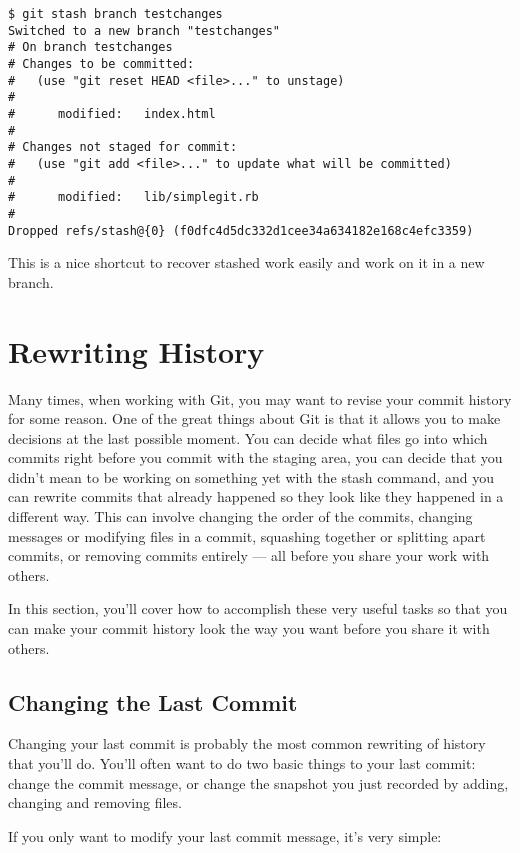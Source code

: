 \documentclass[a4paper]{book}
\begin{document}
\begin{shaded}\begin{verbatim}
$ git stash branch testchanges
Switched to a new branch "testchanges"
# On branch testchanges
# Changes to be committed:
#   (use "git reset HEAD <file>..." to unstage)
#
#      modified:   index.html
#
# Changes not staged for commit:
#   (use "git add <file>..." to update what will be committed)
#
#      modified:   lib/simplegit.rb
#
Dropped refs/stash@{0} (f0dfc4d5dc332d1cee34a634182e168c4efc3359)
\end{verbatim}\end{shaded}

This is a nice shortcut to recover stashed work easily and work on it in a new branch.

\section{Rewriting History}\label{rewriting-history}

Many times, when working with Git, you may want to revise your commit history for some reason. One of the great things about Git is that it allows you to make decisions at the last possible moment. You can decide what files go into which commits right before you commit with the staging area, you can decide that you didn't mean to be working on something yet with the stash command, and you can rewrite commits that already happened so they look like they happened in a different way. This can involve changing the order of the commits, changing messages or modifying files in a commit, squashing together or splitting apart commits, or removing commits entirely --- all before you share your work with others.

In this section, you'll cover how to accomplish these very useful tasks so that you can make your commit history look the way you want before you share it with others.

\subsection{Changing the Last Commit}\label{changing-the-last-commit}

Changing your last commit is probably the most common rewriting of history that you'll do. You'll often want to do two basic things to your last commit: change the commit message, or change the snapshot you just recorded by adding, changing and removing files.

If you only want to modify your last commit message, it's very simple:
\end{document}
